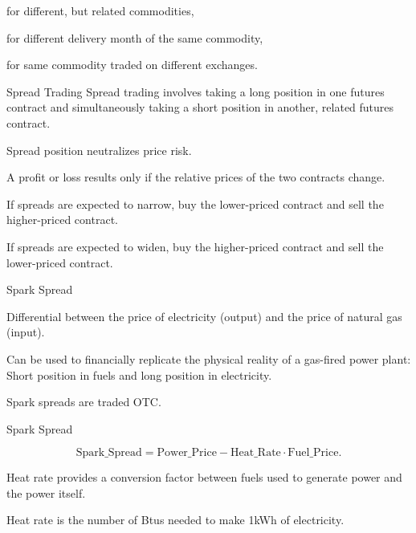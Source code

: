 



	for different, but related commodities,


	for different delivery month of the same commodity,


	for same commodity traded on different exchanges.





{Spread Trading}
Spread trading involves taking a long position in one futures contract and simultaneously taking a short position in another, related futures contract.






	Spread position neutralizes price risk.


	A profit or loss results only if the relative prices of the two contracts change.


	If spreads are expected to narrow, buy the lower-priced contract and sell the higher-priced contract.


	If spreads are expected to widen, buy the higher-priced contract and sell the lower-priced contract.





{Spark Spread}






	Differential between the price of electricity (output) and the price of natural gas (input).


	Can be used to financially replicate the physical reality of a gas-fired power plant: Short position in fuels and long position in electricity.


	Spark spreads are traded OTC.





{Spark Spread}

$$\text{Spark\_Spread}=\text{Power\_Price} - \text{Heat\_Rate}\cdot\text{Fuel\_Price}.$$
\vspace{0.2cm}






	Heat rate provides a conversion factor between fuels used to generate power and the power itself.


	Heat rate is the number of Btus needed to make 1kWh of electricity.


